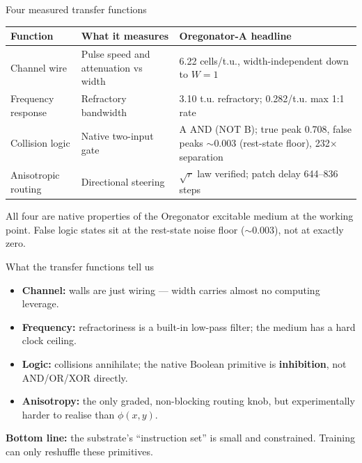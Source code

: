 \documentclass[aspectratio=169,11pt]{beamer}
\begin{document}
\begin{frame}{Four measured transfer functions}

\begin{table}
\centering
\footnotesize
\begin{tabular}{p{3.2cm}p{4.5cm}p{5.5cm}}
\toprule
\textbf{Function} & \textbf{What it measures} & \textbf{Oregonator-A headline} \\
\midrule
Channel wire & Pulse speed and attenuation vs width & 6.22 cells/t.u., width-independent down to $W=1$ \\
Frequency response & Refractory bandwidth & 3.10 t.u. refractory; 0.282/t.u. max 1:1 rate \\
Collision logic & Native two-input gate & A AND (NOT B); true peak 0.708, false peaks $\sim$0.003 (rest-state floor), 232$\times$ separation \\
Anisotropic routing & Directional steering & $\sqrt{r}$ law verified; patch delay 644--836 steps \\
\bottomrule
\end{tabular}
\end{table}

\vspace{0.2cm}
{\small All four are native properties of the Oregonator excitable medium at the working point. False logic states sit at the rest-state noise floor ($\sim$0.003), not at exactly zero.}

\end{frame}

\begin{frame}{What the transfer functions tell us}

\begin{itemize}
    \item \textbf{Channel:} walls are just wiring --- width carries almost no computing leverage.
    \item \textbf{Frequency:} refractoriness is a built-in low-pass filter; the medium has a hard clock ceiling.
    \item \textbf{Logic:} collisions annihilate; the native Boolean primitive is \textbf{inhibition}, not AND/OR/XOR directly.
    \item \textbf{Anisotropy:} the only graded, non-blocking routing knob, but experimentally harder to realise than $\phi(x,y)$.
\end{itemize}

\vspace{0.3cm}
\textbf{Bottom line:} the substrate's ``instruction set'' is small and constrained. Training can only reshuffle these primitives.

\end{frame}
\end{document}
